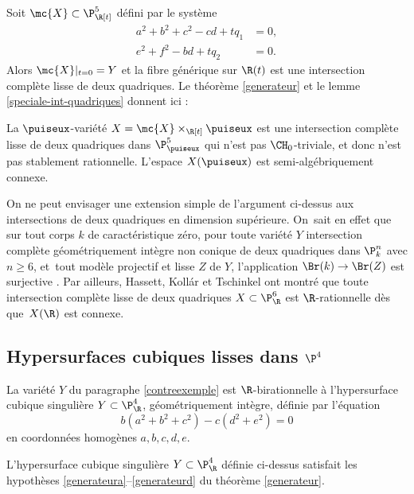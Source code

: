 Soit $\mc{X}\subset \P^5_{\R[t]}$ défini par le système
\begin{align*}
a^2+ b^2+c^2 - cd +tq_1 &=0,\\
e^2+f^2 -bd +t q_2 &=0.
\end{align*}
Alors $\mc{X}|_{t=0}=Y$ et la fibre générique sur $\R(t)$ est une intersection complète lisse de deux quadriques. Le théorème \ref{generateur} et le lemme \ref{speciale-int-quadriques} donnent ici :

\begin{thm}\label{prop-intersection-quadriques}
La $\puiseux$-variété $X= \mc{X}\times_{\R[t]} \puiseux$ est une intersection complète lisse de deux quadriques dans $\P^5_{\puiseux}$ qui n'est pas $\CH_0$-triviale, et donc n'est pas
stablement rationnelle. L'espace $X(\puiseux)$ est semi-algébriquement connexe.\end{thm}

\begin{rmk}
On ne peut envisager une extension simple de l'argument ci-dessus aux intersections de deux quadriques en dimension supérieure. On~sait en effet
que sur tout corps $k$ de caractéristique zéro, pour toute variété $Y$ intersection complète géométriquement intègre non conique de deux quadriques dans $\P^n_k$ avec $n\geq 6$, et~tout modèle projectif et lisse $Z$ de $Y$, l'application
$\Br(k) \to \Br(Z)$ est surjective \cite[Th.\,3.8]{colliot1987intersectionsI}.
Par ailleurs, Hassett, Kollár et Tschinkel
\cite{hassett2022rationality} ont montré que toute intersection complète lisse de deux quadriques $X \subset \P^6_{\R} $
est $\R$-rationnelle dès que~$X(\R)$ est connexe.
\end{rmk}

\subsection{Hypersurfaces cubiques lisses dans \texorpdfstring{$\P^4$}{P4} }\label{exemplecubique}

La variété $Y$ du paragraphe \ref{contreexemple} est $\R$-birationnelle à l'hypersurface cubique singulière $Y \subset \P^4_{\R}$, géométriquement intègre, définie
par l'équation
\begin{equation}\label{Ycub}
b(a^2+b^2+c^2) - c(d^2+e^2)=0
\end{equation}
en coordonnées homogènes $a,b,c,d,e$.

\begin{lemma}\label{cubique}
L'hypersurface cubique singulière $Y \subset \P^4_{\R}$ définie ci-dessus satisfait les hypothèses \eqref{generateura}--\eqref{generateurd} du théorème \ref{generateur}.
\end{lemma}

